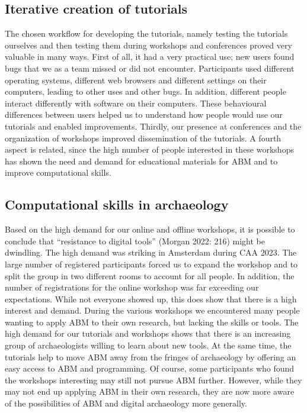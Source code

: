 \documentclass[
]{article}
\begin{document}
\hypertarget{iterative-creation-of-tutorials}{%
\subsection{Iterative creation of tutorials}\label{iterative-creation-of-tutorials}}

The chosen workflow for developing the tutorials, namely testing the tutorials ourselves and then testing them during workshops and conferences proved very valuable in many ways. First of all, it had a very practical use; new users found bugs that we as a team missed or did not encounter. Participants used different operating systems, different web browsers and different settings on their computers, leading to other uses and other bugs. In addition, different people interact differently with software on their computers. These behavioural differences between users helped us to understand how people would use our tutorials and enabled improvements. Thirdly, our presence at conferences and the organization of workshops improved dissemination of the tutorials. A fourth aspect is related, since the high number of people interested in these workshops has shown the need and demand for educational materials for ABM and to improve computational skills.

\hypertarget{computational-skills-in-archaeology}{%
\subsection{Computational skills in archaeology}\label{computational-skills-in-archaeology}}

Based on the high demand for our online and offline workshops, it is possible to conclude that ``resistance to digital tools'' (Morgan 2022: 216) might be dwindling. The high demand was striking in Amsterdam during CAA 2023. The large number of registered participants forced us to expand the workshop and to split the group in two different rooms to account for all people. In addition, the number of registrations for the online workshop was far exceeding our expectations. While not everyone showed up, this does show that there is a high interest and demand. During the various workshops we encountered many people wanting to apply ABM to their own research, but lacking the skills or tools. The high demand for our tutorials and workshops shows that there is an increasing group of archaeologists willing to learn about new tools. At the same time, the tutorials help to move ABM away from the fringes of archaeology by offering an easy access to ABM and programming. Of course, some participants who found the workshops interesting may still not pursue ABM further. However, while they may not end up applying ABM in their own research, they are now more aware of the possibilities of ABM and digital archaeology more generally.
\end{document}
